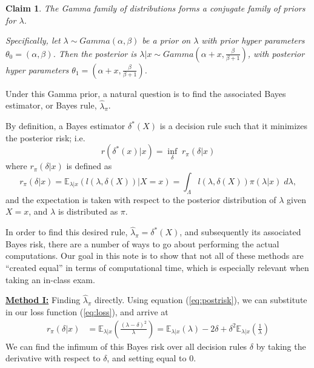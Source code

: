 \documentclass[11pt]{report}
\newtheorem{claim}{Claim}
\begin{document}
\begin{claim}
The Gamma family of distributions forms a conjugate family of priors for $\lambda$.
		
Specifically, let $\lambda \sim Gamma(\alpha,\beta)$ be a prior on $\lambda$ with prior hyper parameters $\theta_0 = (\alpha,\beta)$. Then the posterior is $\lambda|x \sim Gamma\left(\alpha+x, \frac{\beta}{\beta+1}\right)$, with posterior hyper parameters $\theta_1 = \left(\alpha+x, \frac{\beta}{\beta+1}\right)$. 
\end{claim}
		
Under this Gamma prior, a natural question is to find the associated Bayes estimator, or Bayes rule, $\widehat{\lambda}_\pi$.

By definition, a Bayes estimator $\delta^*(X)$ is a decision rule such that it minimizes the posterior risk; i.e.  
$$r(\delta^*(x)|x) = \inf_{\delta}\; r_\pi(\delta|x) $$
where $r_\pi(\delta|x)$ is defined as 
\begin{equation}\label{eq:postrisk}
r_\pi(\delta|x) = \mathbb{E}_{\lambda|x}(l(\lambda,\delta(X))|X=x) = \int_\Lambda l(\lambda,\delta(X)) \pi(\lambda|x) \; d\lambda,
\end{equation}
and the expectation is taken with respect to the posterior distribution of $\lambda$ given $X=x$, and $\lambda$ is distributed as $\pi$. 

In order to find this desired rule, $\widehat{\lambda}_\pi = \delta^*(X)$, and subsequently its associated Bayes risk, there are a number of ways to go about performing the actual computations. Our goal in this note is to show that not all of these methods are ``created equal'' in terms of computational time, which is especially relevant when taking an in-class exam. \newline

 
\underline{\textbf{Method I:}} Finding $\widehat{\lambda}_\pi$ directly. \newline
Using equation (\ref{eq:postrisk}), we can substitute in our loss function (\ref{eq:loss}), and arrive at  
\begin{align*}
r_\pi(\delta|x) 
& = \mathbb{E}_{\lambda|x}\left(\frac{(\lambda-\delta)^2}{\lambda}\right )  = \mathbb{E}_{\lambda|x}\left(\lambda\right) - 2\delta + \delta^2\mathbb{E}_{\lambda|x}\left(\frac{1}{\lambda}\right ) 
\end{align*}
We can find the infimum of this Bayes risk over all decision rules $\delta$ by taking the derivative with respect to $\delta$, and setting equal to 0.
		
\end{document}
